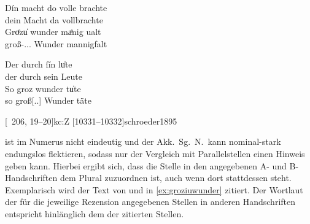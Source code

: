 \begin{exe}
\ex	\begin{xlist}
	\ex \label{ex:kckregel_3}
		\gll Dín macht do {volle brachte} \\
			dein Macht da vollbrachte \\
	\sn \gll Groͤzu̍ wunder {maͤnig ualt} \\
			groß-\Acc.\Pl.\NeutI.\St{} Wunder mannigfalt \\
		\begin{taggedline}{\parencites%
			[\pno~1\ra, 20]{kc:K}[vgl.]
			[\pno~1\ra, 18--19]{kc:C1}%
			[\pno~1\ra, 21--22]{kc:Z}%
		}
		\trans {}
		\end{taggedline}

	\ex \label{ex:kckregel_4}
		\gll Der durch ſín lu̍te \\
			der durch sein Leute \\
	\sn \gll So groz wunder tu̍te \\
			so groß[\Acc.\Pl.\NeutI] Wunder täte \\
		\begin{taggedline}{\parencites%
			[\pno~62\rb, 21--22]{kc:K}[vgl.]%
			[\pno~54\va, 13--14]{kc:C1}%
			[\pno~206\va, 19--20]{kc:Z}%
			[10331--10332]{schroeder1895}
		}
		\trans {}
		\end{taggedline}
	\end{xlist}
\end{exe}

  ist im Numerus nicht eindeutig und der Akk.\ Sg.\
N.\ kann nominal-stark endungslos flektieren, sodass nur der Vergleich mit
Parallelstellen einen Hinweis geben kann. Hierbei ergibt sich, dass die Stelle
in den angegebenen A- und B-Handschriften dem Plural zuzuordnen ist, auch wenn
dort stattdessen \norm{ƶėichen} \wdef{Zeichen} steht. Exemplarisch wird der
Text von \citet{kc:A1} und \citet{kc:B1} in \cref{ex:groziuwunder} zitiert. Der
Wortlaut der für die jeweilige Rezension angegebenen Stellen in anderen
Handschriften entspricht hinlänglich dem der zitierten Stellen.

